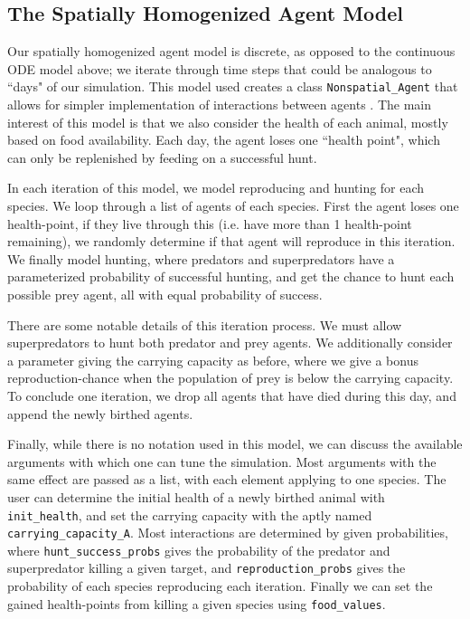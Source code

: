 \documentclass[journal]{IEEEtran}
\begin{document}
\subsection{The Spatially Homogenized Agent Model}
Our spatially homogenized agent model is discrete, as opposed to the continuous ODE model above; we iterate through time steps that could be analogous to ``days" of our simulation. This model used creates a class \verb|Nonspatial_Agent| that allows for simpler implementation of interactions between agents \cite{Agents.jl,Goodwill}. The main interest of this model is that we also consider the health of each animal, mostly based on food availability. Each day, the agent loses one ``health point", which can only be replenished by feeding on a successful hunt.\par
In each iteration of this model, we model reproducing and hunting for each species. We loop through a list of agents of each species. First the agent loses one health-point, if they live through this (i.e. have more than 1 health-point remaining), we randomly determine if that agent will reproduce in this iteration. We finally model hunting, where predators and superpredators have a parameterized probability of successful hunting, and get the chance to hunt each possible prey agent, all with equal probability of success.\par
There are some notable details of this iteration process. We must allow superpredators to hunt both predator and prey agents. We additionally consider a parameter giving the carrying capacity as before, where we give a bonus reproduction-chance when the population of prey is below the carrying capacity. To conclude one iteration, we drop all agents that have died during this day, and append the newly birthed agents.\par
Finally, while there is no notation used in this model, we can discuss the available arguments with which one can tune the simulation. Most arguments with the same effect are passed as a list, with each element applying to one species. The user can determine the initial health of a newly birthed animal with \verb|init_health|, and set the carrying capacity with the aptly named \verb|carrying_capacity_A|. Most interactions are determined by given probabilities, where \verb|hunt_success_probs| gives the probability of the predator and superpredator killing a given target, and \verb|reproduction_probs| gives the probability of each species reproducing each iteration. Finally we can set the gained health-points from killing a given species using \verb|food_values|.
\end{document}
